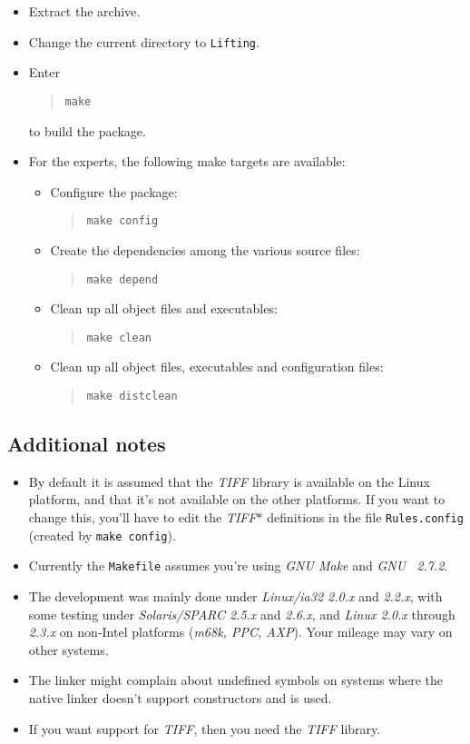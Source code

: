 \begin{itemize}
\item Extract the archive.
\item Change the current directory to \texttt{Lifting}.
\item Enter
    \begin{quote}
    \texttt{make}
    \end{quote}
    to build the package.
\item For the experts, the following make targets are available:
    \begin{itemize}
    \item Configure the package:
	\begin{quote}
	\texttt{make config}
	\end{quote}
    \item Create the dependencies among the various source files:
	\begin{quote}
	\texttt{make depend}
	\end{quote}
    \item Clean up all object files and executables:
	\begin{quote}
	\texttt{make clean}
	\end{quote}
    \item Clean up all object files, executables and configuration files:
	\begin{quote}
	\texttt{make distclean}
	\end{quote}
    \end{itemize}
\end{itemize}

\subsection{Additional notes}

\begin{itemize}
\item By default it is assumed that the \emph{TIFF} library is available on the
    Linux platform, and that it's not available on the other platforms. If you
    want to change this, you'll have to edit the \emph{TIFF$\ast$} definitions
    in the file \texttt{Rules.config} (created by \texttt{make config}).
\item Currently the \texttt{Makefile} assumes you're using \emph{GNU Make} and
    \emph{GNU \CC\ 2.7.2}.
\item The development was mainly done under \emph{Linux/ia32 2.0.x} and
    \emph{2.2.x}, with some testing under \emph{Solaris/SPARC 2.5.x} and
    \emph{2.6.x}, and \emph{Linux 2.0.x} through \emph{2.3.x} on non-Intel
    platforms (\emph{m68k, PPC, AXP}). Your mileage may vary on other
    systems.
\item The linker might complain about undefined symbols on systems where the
    native linker doesn't support constructors and  is used.
\item If you want support for \emph{TIFF}, then you need the \emph{TIFF}
    library.
\end{itemize}
